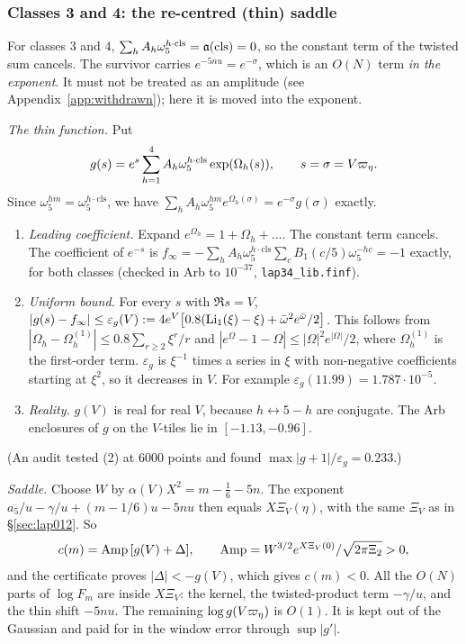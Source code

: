 \subsubsection{Classes 3 and 4: the re-centred (thin) saddle}\label{sec:lap34}

For classes $3$ and $4$, $\sum_hA_h\omega_5^{h\cdot\mathrm{cls}}=\mathfrak a(\mathrm{cls})=0$, so the constant term of the twisted sum
cancels. The survivor carries $e^{-5nu}=e^{-\sigma}$, which is an $O(N)$ term \emph{in the exponent}. It must not be
treated as an amplitude (see Appendix~\ref{app:withdrawn}); here it is moved into the exponent.

\emph{The thin function.} Put
\[
g(s)=e^{s}\sum_{h=1}^4A_h\omega_5^{h\cdot\mathrm{cls}}\exp(\Omega_h(s)),\qquad s=\sigma=V\varpi_\eta .
\]
Since $\omega_5^{hm}=\omega_5^{h\cdot\mathrm{cls}}$, we have $\sum_hA_h\omega_5^{hm}e^{\Omega_h(\sigma)}=e^{-\sigma}g(\sigma)$ exactly.

\begin{lemma}\label{lem:thin}
\begin{enumerate}
\item \emph{Leading coefficient.} Expand $e^{\Omega_h}=1+\Omega_h+\dots$. The constant term cancels. The coefficient of
$e^{-s}$ is $f_\infty=-\sum_hA_h\omega_5^{h\cdot\mathrm{cls}}\sum_cB_1(c/5)\omega_5^{-hc}=-1$ exactly, for both classes
(checked in Arb to $10^{-37}$, \texttt{lap34\_lib.finf}).
\item \emph{Uniform bound.} For every $s$ with $\Re s=V$,
$|g(s)-f_\infty|\le\varepsilon_g(V):=4e^V\big[0.8(\operatorname{Li}_1(\xi)-\xi)+\bar\omega^2e^{\bar\omega}/2\big]$. This follows from
$|\Omega_h-\Omega_h^{(1)}|\le0.8\sum_{r\ge2}\xi^r/r$ and $|e^\Omega-1-\Omega|\le|\Omega|^2e^{|\Omega|}/2$, where
$\Omega_h^{(1)}$ is the first-order term. $\varepsilon_g$ is $\xi^{-1}$ times a series in $\xi$ with non-negative
coefficients starting at $\xi^2$, so it decreases in $V$. For example $\varepsilon_g(11.99)=1.787\cdot10^{-5}$.
\item \emph{Reality.} $g(V)$ is real for real $V$, because $h\leftrightarrow5-h$ are conjugate. The Arb enclosures of $g$ on
the $V$-tiles lie in $[-1.13,-0.96]$.
\end{enumerate}
\end{lemma}
(An audit tested (2) at $6000$ points and found $\max|g+1|/\varepsilon_g=0.233$.)

\emph{Saddle.} Choose $W$ by $\alpha(V)X^2=m-\tfrac16-5n$. The exponent $a_5/u-\gamma/u+(m-1/6)u-5nu$ then equals
$X\Xi_V(\eta)$, with the same $\Xi_V$ as in \S\ref{sec:lap012}. So
\[
c(m)=\operatorname{Amp}\,[g(V)+\Delta],\qquad \operatorname{Amp}=W^{3/2}e^{X\Xi_V(0)}/\sqrt{2\pi\Xi_2}>0,
\]
and the certificate proves $|\Delta|<-g(V)$, which gives $c(m)<0$. All the $O(N)$ parts of $\log F_m$ are inside $X\Xi_V$:
the kernel, the twisted-product term $-\gamma/u$, and the thin shift $-5nu$. The remaining $\log g(V\varpi_\eta)$ is $O(1)$.
It is kept out of the Gaussian and paid for in the window error through $\sup|g'|$.

